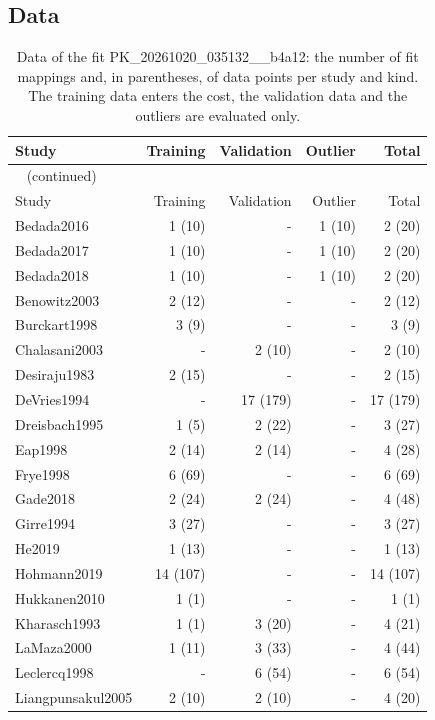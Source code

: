 \subsection{Data}

\begin{longtable}{lrrrr}
\caption{Data of the fit PK\_20261020\_035132\_\_b4a12: the number of fit mappings and, in parentheses, of data points per study and kind. The training data enters the cost, the validation data and the outliers are evaluated only.}\label{tab:data:PK_20261020_035132__b4a12} \\
\toprule
Study & Training & Validation & Outlier & Total \\
\midrule
\endfirsthead
\multicolumn{5}{l}{\small\tablename~\thetable{} (continued)} \\
\toprule
Study & Training & Validation & Outlier & Total \\
\midrule
\endhead
\bottomrule
\endlastfoot
Bedada2016 & 1 (10) & - & 1 (10) & 2 (20) \\
Bedada2017 & 1 (10) & - & 1 (10) & 2 (20) \\
Bedada2018 & 1 (10) & - & 1 (10) & 2 (20) \\
Benowitz2003 & 2 (12) & - & - & 2 (12) \\
Burckart1998 & 3 (9) & - & - & 3 (9) \\
Chalasani2003 & - & 2 (10) & - & 2 (10) \\
Desiraju1983 & 2 (15) & - & - & 2 (15) \\
DeVries1994 & - & 17 (179) & - & 17 (179) \\
Dreisbach1995 & 1 (5) & 2 (22) & - & 3 (27) \\
Eap1998 & 2 (14) & 2 (14) & - & 4 (28) \\
Frye1998 & 6 (69) & - & - & 6 (69) \\
Gade2018 & 2 (24) & 2 (24) & - & 4 (48) \\
Girre1994 & 3 (27) & - & - & 3 (27) \\
He2019 & 1 (13) & - & - & 1 (13) \\
Hohmann2019 & 14 (107) & - & - & 14 (107) \\
Hukkanen2010 & 1 (1) & - & - & 1 (1) \\
Kharasch1993 & 1 (1) & 3 (20) & - & 4 (21) \\
LaMaza2000 & 1 (11) & 3 (33) & - & 4 (44) \\
Leclercq1998 & - & 6 (54) & - & 6 (54) \\
Liangpunsakul2005 & 2 (10) & 2 (10) & - & 4 (20) \\

\end{longtable}
